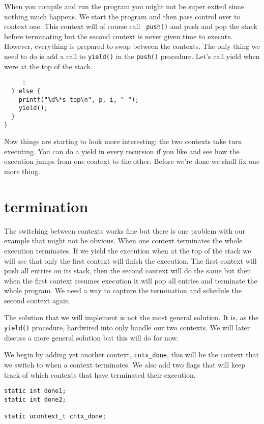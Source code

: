 \documentclass[a4paper,11pt]{article}
\begin{document}
When you compile and run the program you might not be super exited
since nothing much happens. We start the program and then pass
control over to context one. This context will of course call {\tt
  push()} and push and pop the stack before terminating but the
second context is never given time to execute. However, everything is
prepared to swap between the contexts. The only thing we need to do is
add a call to {\tt yield()} in the {\tt push()} procedure. Let's call
yield when were at the top of the stack.


\begin{lstlisting}
     :
  } else {
    printf("%d%*s top\n", p, i, " ");
    yield();
  }
}
\end{lstlisting}

Now things are starting to look more interesting; the two contexts
take turn executing. You can do a yield in every recursion if you like
and see how the execution jumps from one context to the other. Before
we're done we shall fix one more thing.

\section{termination}

The switching between contexts works fine but there is one problem
with our example that might not be obvious. When one context
terminates the whole execution terminates. If we yield the execution
when at the top of the stack we will see that only the first context
will finish the execution. The first context will push all entries on
its stack, then the second context will do the same but then when the
first context resumes execution it will pop all entries and terminate
the whole program. We need a way to capture the termination and
schedule the second context again.

The solution that we will implement is not the most general
solution. It is, as the {\tt yield()} procedure, hardwired into only
handle our two contexts. We will later discuss a more general solution
but this will do for now.

We begin by adding yet another context, {\tt cntx\_done}, this will be the context that
we switch to when a context terminates. We also add two flags that
will keep track of which contexts that have terminated their execution.

\begin{lstlisting}
static int done1;
static int done2;

static ucontext_t cntx_done;
\end{lstlisting}
\end{document}
